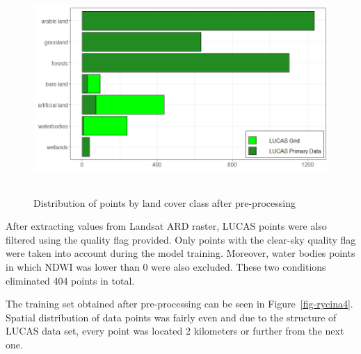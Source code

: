 \documentclass{amuthesis}
\begin{document}
\begin{figure}[H]

{\centering \includegraphics[width=5.55208in,height=3.125in]{./figures/lucas_data.png}

}

\caption{\label{fig-rycina3}Distribution of points by land cover class
after pre-processing}

\end{figure}

After extracting values from Landsat ARD raster, LUCAS points were also
filtered using the quality flag provided. Only points with the clear-sky
quality flag were taken into account during the model training.
Moreover, water bodies points in which NDWI was lower than 0 were also
excluded. These two conditions eliminated 404 points in total.

The training set obtained after pre-processing can be seen in
Figure~\ref{fig-rycina4}. Spatial distribution of data points was fairly
even and due to the structure of LUCAS data set, every point was located
2 kilometers or further from the next one.
\end{document}
